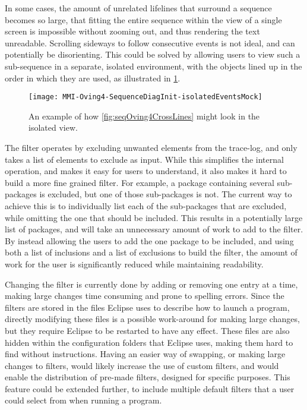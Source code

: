 In some cases, the amount of unrelated lifelines that surround a sequence becomes so large, that fitting the entire sequence within the view of a single screen is impossible without zooming out, and thus rendering the text unreadable.
Scrolling sideways to follow consecutive events is not ideal, and can potentially be disorienting.
This could be solved by allowing users to view such a sub-sequence in a separate, isolated environment, with the objects lined up in the order in which they are used, as illustrated in \cref{fig:seqOving4IsolatedMock}.


\begin{figure}[H]
	\centering
	\texttt{[image: MMI-Oving4-SequenceDiagInit-isolatedEventsMock]}
	\caption{An example of how \cref{fig:seqOving4CrossLines} might look in the isolated view.}
	\label{fig:seqOving4IsolatedMock}
\end{figure}


The filter operates by excluding unwanted elements from the trace-log, and only takes a list of elements to exclude as input.
While this simplifies the internal operation, and makes it easy for users to understand, it also makes it hard to build a more fine grained filter.
For example, a package containing several sub-packages is excluded, but one of those sub-packages is not.
The current way to achieve this is to individually list each of the sub-packages that are excluded, while omitting the one that should be included.
This results in a potentially large list of packages, and will take an unnecessary amount of work to add to the filter.
By instead allowing the users to add the one package to be included, and using both a list of inclusions and a list of exclusions to build the filter, the amount of work for the user is significantly reduced while maintaining readability.


Changing the filter is currently done by adding or removing one entry at a time, making large changes time consuming and prone to spelling errors.
Since the filters are stored in the files Eclipse uses to describe how to launch a program, directly modifying these files is a possible work-around for making large changes, but they require Eclipse to be restarted to have any effect.
These files are also hidden within the configuration folders that Eclipse uses, making them hard to find without instructions.
Having an easier way of swapping, or making large changes to filters, would likely increase the use of custom filters, and would enable the distribution of pre-made filters, designed for specific purposes.
This feature could be extended further, to include multiple default filters that a user could select from when running a program.


